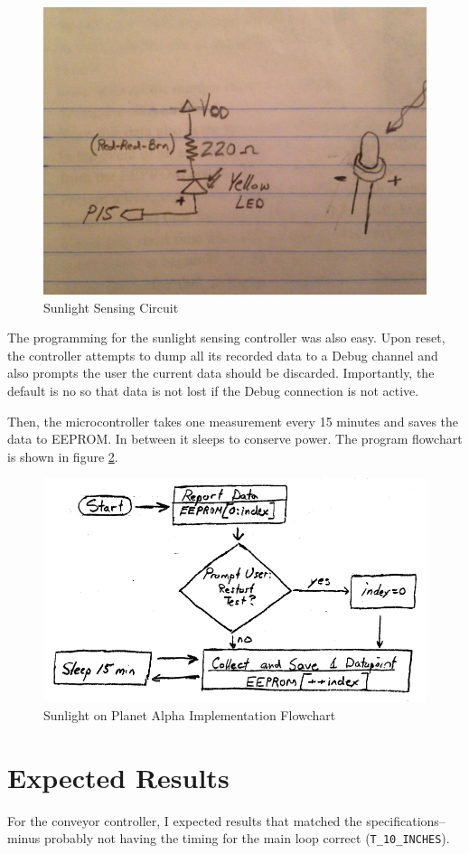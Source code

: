 \documentclass[11pt]{article}
\begin{document}
\begin{figure}[h!]
\centering
\includegraphics[width=.45\textwidth]{sunshine-circuit.jpg}
\caption{Sunlight Sensing Circuit}
\label{sunshine-circuit}
\end{figure}

The programming for the sunlight sensing controller was also easy.
Upon reset, the controller attempts to dump all its recorded data to
a Debug channel and also prompts the user the current data should
be discarded.
Importantly, the default is no so that data is not lost if the Debug connection is not active.

Then, the microcontroller takes one measurement every 15 minutes and saves
the data to EEPROM. In between it sleeps to conserve power.
The program flowchart is shown in figure \ref{sunshine-flowchart}.

\begin{figure}[h!]
\centering
\includegraphics[width=.65\textwidth]{sunshine-flowchart.pdf}
\caption{Sunlight on Planet Alpha Implementation Flowchart}
\label{sunshine-flowchart}
\end{figure}

\section{Expected Results}

For the conveyor controller, I expected results that matched the specifications--minus
probably not having the timing for the main loop correct (\texttt{T\_10\_INCHES}).
\end{document}
